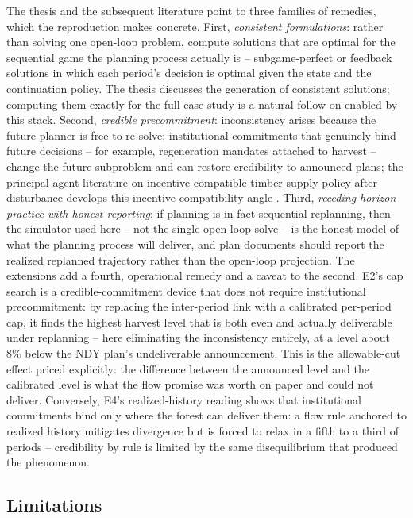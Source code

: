 The thesis and the subsequent literature point to three families of remedies, which the reproduction makes concrete. First, \emph{consistent formulations}: rather than solving one open-loop problem, compute solutions that are optimal for the sequential game the planning process actually is -- subgame-perfect or feedback solutions in which each period's decision is optimal given the state and the continuation policy. The thesis discusses the generation of consistent solutions; computing them exactly for the full case study is a natural follow-on enabled by this stack. Second, \emph{credible precommitment}: inconsistency arises because the future planner is free to re-solve; institutional commitments that genuinely bind future decisions -- for example, regeneration mandates attached to harvest -- change the future subproblem and can restore credibility to announced plans; the principal-agent literature on incentive-compatible timber-supply policy after disturbance develops this incentive-compatibility angle \citep{bogle2015protecting}. Third, \emph{receding-horizon practice with honest reporting}: if planning is in fact sequential replanning, then the simulator used here -- not the single open-loop solve -- is the honest model of what the planning process will deliver, and plan documents should report the realized replanned trajectory rather than the open-loop projection. The extensions add a fourth, operational remedy and a caveat to the second. E2's cap search is a credible-commitment device that does not require institutional precommitment: by replacing the inter-period link with a calibrated per-period cap, it finds the highest harvest level that is both even and actually deliverable under replanning -- here eliminating the inconsistency entirely, at a level about 8\% below the NDY plan's undeliverable announcement. This is the allowable-cut effect priced explicitly: the difference between the announced level and the calibrated level is what the flow promise was worth on paper and could not deliver. Conversely, E4's realized-history reading shows that institutional commitments bind only where the forest can deliver them: a flow rule anchored to realized history mitigates divergence but is forced to relax in a fifth to a third of periods -- credibility by rule is limited by the same disequilibrium that produced the phenomenon.

\hypertarget{limitations}{%
\subsection{Limitations}\label{limitations}}

